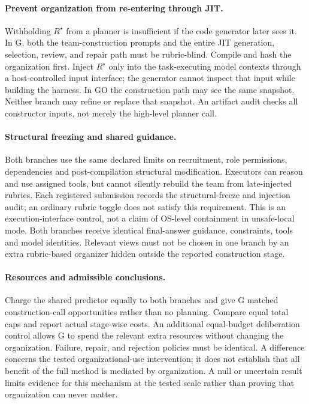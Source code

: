 \paragraph{Prevent organization from re-entering through JIT.}
Withholding $R^{\star}$ from a planner is insufficient if the code generator later sees it. In G, both the team-construction prompts and the entire JIT generation, selection, review, and repair path must be rubric-blind. Compile and hash the organization first. Inject $R^{\star}$ only into the task-executing model contexts through a host-controlled input interface; the generator cannot inspect that input while building the harness. In GO the construction path may see the same snapshot. Neither branch may refine or replace that snapshot. An artifact audit checks all constructor inputs, not merely the high-level planner call.

\paragraph{Structural freezing and shared guidance.}
Both branches use the same declared limits on recruitment, role permissions, dependencies and post-compilation structural modification. Executors can reason and use assigned tools, but cannot silently rebuild the team from late-injected rubrics. Each registered submission records the structural-freeze and injection audit; an ordinary rubric toggle does not satisfy this requirement. This is an execution-interface control, not a claim of OS-level containment in unsafe-local mode. Both branches receive identical final-answer guidance, constraints, tools and model identities. Relevant views must not be chosen in one branch by an extra rubric-based organizer hidden outside the reported construction stage.

\paragraph{Resources and admissible conclusions.}
Charge the shared predictor equally to both branches and give G matched construction-call opportunities rather than no planning. Compare equal total caps and report actual stage-wise costs. An additional equal-budget deliberation control allows G to spend the relevant extra resources without changing the organization. Failure, repair, and rejection policies must be identical. A difference concerns the tested organizational-use intervention; it does not establish that all benefit of the full method is mediated by organization. A null or uncertain result limits evidence for this mechanism at the tested scale rather than proving that organization can never matter.

